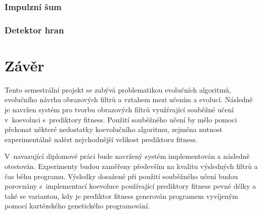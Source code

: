 


\subsection{Impulzní šum}

\subsection{Detektor hran}



\chapter{Závěr}
\label{chConclusions}

Tento semestrální projekt se zabývá problematikou evolučních algoritmů, evolučního návrhu obrazových filtrů a vztahem mezi učením a evolucí. Následně je navržen systém pro tvorbu obrazových filtrů využívající souběžné učení v~koevoluci s~prediktory fitness. Použití souběžného učení by mělo pomoci překonat některé nedostatky koevolučního algoritmu, zejména nutnost experimentálně nalézt nejvhodnější velikost prediktoru fitness.


V~navazující diplomové práci bude navržený systém implementován a následně otestován. Experimenty budou zaměřeny především na kvalitu výsledných filtrů a čas běhu programu. Výsledky dosažené při použití souběžného učení budou porovnány s~implementací koevoluce používající prediktory fitness pevné délky a také se variantou, kdy je prediktor fitness generován programem vyvíjeným pomocí kartézského genetického programování.
